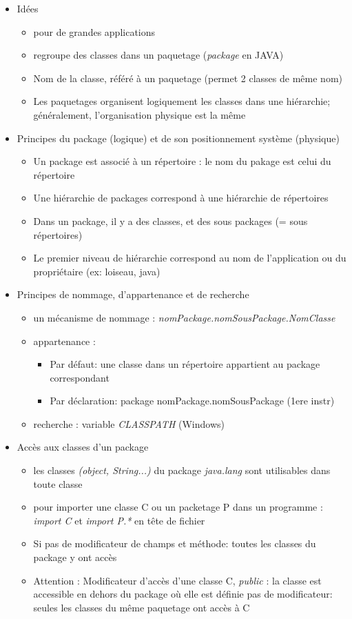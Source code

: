 \documentclass{article}
\begin{document}
\begin{itemize}
	\item Idées
	\begin{itemize}
		\item pour de grandes applications
		\item regroupe des classes dans un paquetage (\emph{package} en JAVA)
		\item Nom de la classe, référé à un paquetage (permet 2 classes de même nom)
		\item  Les paquetages organisent logiquement les classes dans une hiérarchie;
	généralement, l’organisation physique est la même
	\end{itemize}
	\item Principes du package (logique) et de son positionnement système (physique)
	\begin{itemize}
		\item Un package est associé à un répertoire : le nom du pakage est celui du
			répertoire
		\item Une hiérarchie de packages correspond à une hiérarchie de répertoires
		\item Dans un package, il y a des classes, et des sous packages (= sous répertoires)
		\item Le premier niveau de hiérarchie correspond au nom de l’application ou du
			propriétaire (ex: loiseau, java)
	\end{itemize}
	\item Principes de nommage, d’appartenance et de recherche
	\begin{itemize}
		\item un mécanisme de nommage : \emph{nomPackage.nomSousPackage.NomClasse}
		\item appartenance :
			\begin{itemize}
				\item Par défaut: une classe dans un répertoire appartient au package 
					correspondant
				\item Par déclaration: package nomPackage.nomSousPackage (1ere instr)
			\end{itemize}
		\item recherche : variable \emph{CLASSPATH} (Windows)
	\end{itemize}
	\item Accès aux classes d’un package
	\begin{itemize}
		\item les classes \emph{(object, String...)} du package \emph{java.lang} sont utilisables
			dans toute classe
		\item pour importer une classe C ou un packetage P dans un programme :
			\emph{import C} et \emph{import P.* } en tête de fichier
		\item Si pas de modificateur de champs et méthode: toutes les classes du package y
			ont accès
		\item Attention : Modificateur d'accès d'une classe C,  
			\emph{public} : la classe est accessible en dehors du package où elle est définie
			pas de modificateur: seules les classes du même paquetage ont accès à C
	\end{itemize}
\end{itemize} 
\end{document}
